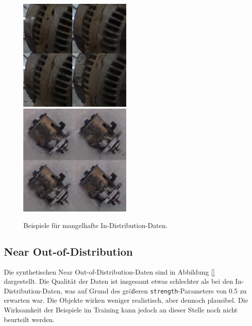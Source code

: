 \begin{figure}[h]
	\centering
	\includegraphics[width=0.5\textwidth]{figure_results_id-augs_detail_1.png}%
	\includegraphics[width=0.5\textwidth]{figure_results_id-augs_detail_2.png}
	\caption{Beispiele für mangelhafte In-Distribution-Daten.}
	\label{fig:id-augs-detail-bad}
\end{figure}

\subsection{Near Out-of-Distribution} \label{sec:da-fusion-ood-results}

Die synthetischen Near Out-of-Distribution-Daten sind in Abbildung \ref{} dargestellt. Die Qualität der Daten ist insgesamt etwas schlechter als bei den In-Distribution-Daten, was auf Grund des größeren \lstinline{strength}-Parameters von 0.5 zu erwarten war. Die Objekte wirken weniger realistisch, aber dennoch plausibel. Die Wirksamkeit der Beispiele im Training kann jedoch an dieser Stelle noch nicht beurteilt werden.


